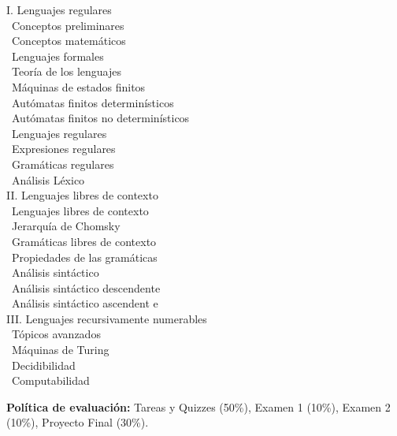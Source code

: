 \documentclass[12pt, letterpaper, oneside]{article}
\newcommand{\topic}{{\color{darkgreen}{\Rectangle}}}
\newcommand{\subtopic}{{\enskip \color{darkblue}{\Rectangle}}}
\begin{document}
  \begin{center} 
  \begin{minipage}{5in}
  \begin{flushleft}
  {\large I. Lenguajes regulares} \\[2ex]
  \topic ~Conceptos preliminares \\
  \subtopic ~Conceptos matemáticos \\
  \subtopic ~Lenguajes formales \\
  \topic ~Teoría de los lenguajes \\
  \subtopic ~Máquinas de estados finitos \\
  \subtopic ~Autómatas finitos determinísticos \\
  \subtopic ~Autómatas finitos no determinísticos \\
  \topic ~Lenguajes regulares \\
  \subtopic ~Expresiones regulares \\
  \subtopic ~Gramáticas regulares \\
  \subtopic ~Análisis Léxico \\[2.5ex]
  {\large II. Lenguajes libres de contexto }\\[2ex]
  \topic ~Lenguajes libres de contexto \\
  \subtopic ~Jerarquía de Chomsky \\
  \subtopic ~Gramáticas libres de contexto \\
  \subtopic ~Propiedades de las gramáticas \\
  \topic ~Análisis sintáctico \\
  \subtopic ~Análisis sintáctico descendente \\
  \subtopic ~Análisis sintáctico ascendent e\\[2.5ex]
  {\large III. Lenguajes recursivamente numerables} \\[2ex]
  \topic ~Tópicos avanzados \\
  \subtopic ~Máquinas de Turing \\
  \subtopic ~Decidibilidad \\
  \subtopic ~Computabilidad
  \end{flushleft}
  \end{minipage}
  \end{center}

  \vspace*{.15in}
  \noindent\textbf{Política de evaluación:}
  Tareas y Quizzes (50\%), Examen 1 (10\%), Examen 2 (10\%), Proyecto Final (30\%).
\end{document}
